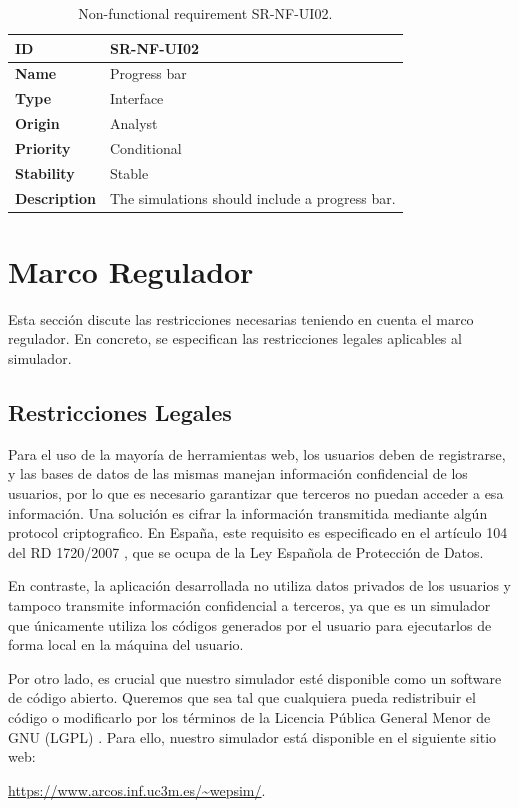 \begin{center}
\begin{table}[htbp]
\centering
\begin{tabular}{@{}p{2.5cm} p{9cm}@{}}  
\toprule
\textbf{ID} 				& SR-NF-UI02\\
\midrule
\textbf{Name} 			& Progress bar \\
\midrule
\textbf{Type} 			& Interface \\
\midrule
\textbf{Origin} 			& Analyst \\
\midrule
\textbf{Priority}		& Conditional \\
\midrule
\textbf{Stability} 		& Stable \\
\midrule
\textbf{Description} 	& The simulations should include a progress bar. \\
\bottomrule
\end{tabular}
\caption{Non-functional requirement SR-NF-UI02.}
\label{tab:srnfui02}
\end{table}
\end{center}

\fi

\section{Marco Regulador}
\label{sec:regulatory_framework}

Esta sección discute las restricciones necesarias teniendo en cuenta el marco regulador. En concreto, se especifican las restricciones legales aplicables al simulador.

\subsection{Restricciones Legales}
\label{sec:legal_constraints}

Para el uso de la mayoría de herramientas web, los usuarios deben de registrarse, y las bases de datos de las mismas manejan información confidencial de los usuarios, por lo que es necesario garantizar que terceros no puedan acceder a esa información. Una solución es cifrar la información transmitida mediante algún \gls{protocol} criptografico. En España, este requisito es especificado en el artículo 104 del RD 1720/2007 \cite{boe2008}, que se ocupa de la Ley Española de Protección de Datos.


En contraste, la aplicación desarrollada no utiliza datos privados de los usuarios y tampoco transmite información confidencial a terceros, ya que es un simulador que únicamente utiliza los códigos generados por el usuario para ejecutarlos de forma local en la máquina del usuario.


Por otro lado, es crucial que nuestro simulador esté disponible como un software de código abierto. Queremos que sea tal que cualquiera pueda redistribuir el código o modificarlo por los términos de la Licencia Pública General Menor de GNU (LGPL) \cite{gnulgpl}. Para ello, nuestro simulador está disponible en el siguiente sitio web: 

\url{https://www.arcos.inf.uc3m.es/~wepsim/}.

\afterpage{\blankpage} %